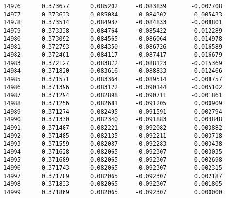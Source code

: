 \documentclass[11pt]{article}
\begin{document}
\begin{verbatim}
14976      0.373677      0.085202     -0.083839       -0.002708   
14977      0.373623      0.085084     -0.084302       -0.005433   
14978      0.373514      0.084937     -0.084833       -0.008801   
14979      0.373338      0.084764     -0.085422       -0.012289   
14980      0.373092      0.084565     -0.086064       -0.014978   
14981      0.372793      0.084350     -0.086726       -0.016589   
14982      0.372461      0.084117     -0.087417       -0.016679   
14983      0.372127      0.083872     -0.088123       -0.015369   
14984      0.371820      0.083616     -0.088833       -0.012466   
14985      0.371571      0.083364     -0.089514       -0.008757   
14986      0.371396      0.083122     -0.090144       -0.005102   
14987      0.371294      0.082898     -0.090711       -0.001861   
14988      0.371256      0.082681     -0.091205        0.000909   
14989      0.371274      0.082495     -0.091591        0.002794   
14990      0.371330      0.082340     -0.091883        0.003848   
14991      0.371407      0.082221     -0.092082        0.003882   
14992      0.371485      0.082135     -0.092211        0.003718   
14993      0.371559      0.082087     -0.092283        0.003438   
14994      0.371628      0.082065     -0.092307        0.003035   
14995      0.371689      0.082065     -0.092307        0.002698   
14996      0.371743      0.082065     -0.092307        0.002315   
14997      0.371789      0.082065     -0.092307        0.002187   
14998      0.371833      0.082065     -0.092307        0.001805   
14999      0.371869      0.082065     -0.092307        0.000000   


\end{verbatim}
\end{document}
